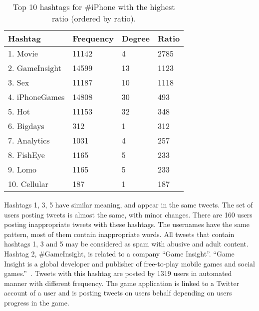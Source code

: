 \documentclass[journal, a4paper, 12pt]{article}
\begin{document}
 \begin{table}[!hbt]
            \begin{center}
            \caption{Top 10 hashtags for \#iPhone with the highest ratio (ordered by ratio).}
            \label{tab:hashtagratioiphonetop}
            \begin{tabular}{|p{5cm}|p{2cm}|p{2cm}|p{2cm}|}
                  \hline
                  Hashtag & Frequency & Degree & Ratio \\
            \hline
                  1. Movie & 11142 & 4 & 2785 \\
                  \hline
                  2. GameInsight & 14599 & 13 & 1123 \\
                  \hline
                  3. Sex & 11187 & 10 & 1118 \\
            \hline
            4. iPhoneGames & 14808 & 30 & 493 \\
                  \hline
            5. Hot & 11153 & 32 & 348 \\
            \hline
            6. Bigdays & 312 & 1 & 312 \\
                  \hline
            7. Analytics & 1031 & 4 & 257 \\
            \hline
            8. FishEye & 1165 & 5 & 233 \\
            \hline
            9. Lomo & 1165 & 5 & 233 \\
            \hline
            10. Cellular & 187 & 1 & 187 \\
            \hline
            \end{tabular}
            \end{center}
      \end{table}
    
    
Hashtags 1, 3, 5 have similar meaning, and appear in the same tweets. The set of users posting tweets is almost the same, with minor changes. There are 160 users posting inappropriate tweets with these hashtags. The usernames have the same pattern, most of them contain inappropriate words. All tweets that contain hashtags 1, 3 and 5 may be considered as spam with abusive and adult content. \\

Hashtag 2, \#GameInsight, is related to a company ``Game Insight''. ``Game Insight is a global developer and publisher of free-to-play mobile games and social games.''~\cite{wiki_gameinsight}. Tweets with this hashtag are posted by 1319 users in automated manner with different frequency. The game application is linked to a Twitter account of a user and is posting tweets on users behalf depending on users progress in the game. \\
\end{document}
